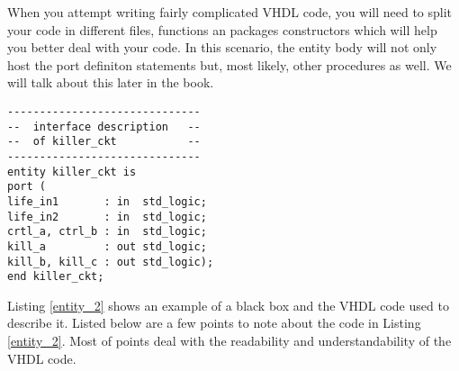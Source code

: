 When you attempt writing fairly complicated VHDL code, you will need to split your code in different files, functions an packages constructors which will help you better deal with your code. In this scenario, the entity body will not only host the port definiton statements but, most likely, other procedures as well. We will talk about this later in the book.\\
\begin{minipage}{0.51\linewidth}
\vspace{5pt}
\begin{lstlisting}[label=entity_2, caption=VHDL entity declaration.]
------------------------------
--  interface description   --
--  of killer_ckt           --
------------------------------
entity killer_ckt is
port (
life_in1       : in  std_logic;
life_in2       : in  std_logic;
crtl_a, ctrl_b : in  std_logic;
kill_a         : out std_logic;
kill_b, kill_c : out std_logic);
end killer_ckt;
\end{lstlisting}
\end{minipage}
\begin{minipage}{0.49\linewidth}
\begin{flushright}
\end{flushright}
\end{minipage}

Listing \ref{entity_2} shows an example of a black box and the VHDL code used to describe it. Listed below are a few points to note about the code in Listing \ref{entity_2}. Most of points deal with the readability and understandability of the VHDL code.

